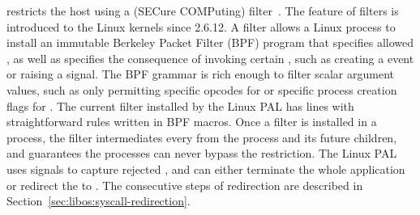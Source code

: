 



\graphene{} restricts the host \linuxapis{} 
using a \seccomp{} (SECure COMPuting) filter~\cite{seccomp}. The feature of \seccomp{} filters is introduced to the Linux kernels since 2.6.12.
A \seccomp{} filter allows a Linux process to install an immutable Berkeley Packet Filter (BPF) program
that specifies allowed \linuxapis{}, as well as specifies
the consequence of invoking certain \linuxapis{}, such as creating a  event or raising a  signal.
The BPF grammar is rich enough to filter scalar argument values,
such as only permitting specific opcodes for  or specific process creation flags for .
The current \seccomp{} filter installed by the Linux PAL has \seccomplines{} lines 
with straightforward rules written in BPF macros.  %
Once a \seccomp{} filter is installed in a process,
the filter intermediates
every \linuxapis{} from the process and its future children, and guarantees the processes can never bypass the restriction.
The Linux PAL uses  signals to capture rejected \linuxapis{},
and can either terminate the whole application or
redirect the \linuxapi{} to \thelibos{}.
The consecutive steps of \linuxapi{} redirection are described in Section~\ref{sec:libos:syscall-redirection}.



